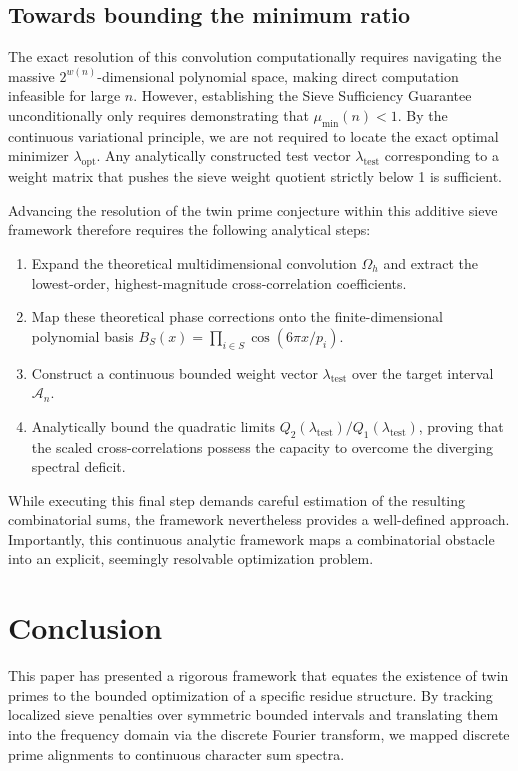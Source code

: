 \documentclass[reqno,notitlepage]{amsart}
\theoremstyle{remark}
\begin{document}
\subsection{Towards bounding the minimum ratio}

The exact resolution of this convolution computationally requires navigating the massive
$2^{w(n)}$-dimensional polynomial space, making direct computation infeasible
for large $n$. However, establishing the Sieve Sufficiency Guarantee unconditionally only
requires demonstrating that $\mu_{\min}(n) < 1$. By the continuous variational principle, we are not
required to locate the exact optimal minimizer $\lambda_{\mathrm{opt}}$. Any analytically constructed
test vector $\lambda_{\mathrm{test}}$ corresponding to a weight matrix that pushes the sieve weight
quotient strictly below 1 is sufficient. 

Advancing the resolution of the twin prime conjecture within this additive sieve framework therefore
requires the following analytical steps:
\begin{enumerate}
    \item Expand the theoretical multidimensional convolution $\Omega_h$ and extract the lowest-order,
highest-magnitude cross-correlation coefficients.
    \item Map these theoretical phase corrections onto the finite-dimensional polynomial basis
    $B_S(x) = \prod_{i \in S} \cos(6\pi x/p_i)$.
    \item Construct a continuous bounded weight vector $\lambda_{\mathrm{test}}$ over the target interval
    $\mathcal{A}_n$.
    \item Analytically bound the quadratic limits $Q_2(\lambda_{\mathrm{test}}) / Q_1(\lambda_{\mathrm{test}})$,
    proving that the scaled cross-correlations possess the capacity to overcome the diverging
    spectral deficit.
\end{enumerate}

While executing this final step demands careful estimation of the resulting combinatorial sums, the
framework nevertheless provides a well-defined approach. Importantly, this continuous analytic
framework maps a combinatorial obstacle into an explicit, seemingly resolvable optimization problem.

\section{Conclusion} \label{sec:conclusion}

This paper has presented a rigorous framework that equates the existence of twin primes to
the bounded optimization of a specific residue structure. By tracking localized sieve
penalties over symmetric bounded intervals and translating them into the frequency domain via
the discrete Fourier transform, we mapped discrete prime alignments to continuous character sum spectra.
\end{document}
